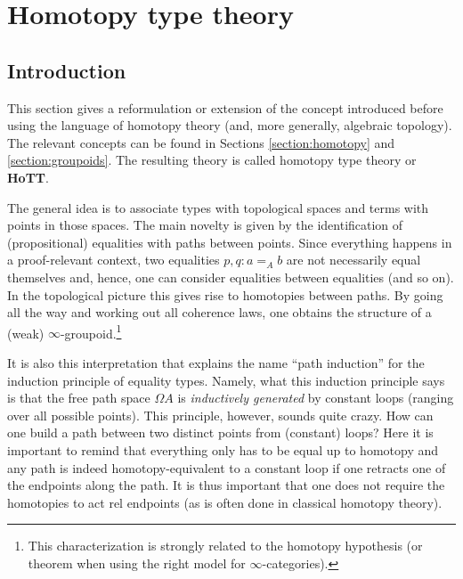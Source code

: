 \section{Homotopy type theory}
\subsection{Introduction}

    This section gives a reformulation or extension of the concept introduced before using the language of homotopy theory (and, more generally, algebraic topology). The relevant concepts can be found in Sections \ref{section:homotopy} and \ref{section:groupoids}. The resulting theory is called homotopy type theory or \textbf{HoTT}.

    The general idea is to associate types with topological spaces and terms with points in those spaces. The main novelty is given by the identification of (propositional) equalities with paths between points. Since everything happens in a proof-relevant context, two equalities $p,q:a=_Ab$ are not necessarily equal themselves and, hence, one can consider equalities between equalities (and so on). In the topological picture this gives rise to homotopies between paths. By going all the way and working out all coherence laws, one obtains the structure of a (weak) $\infty$-groupoid.\footnote{This characterization is strongly related to the homotopy hypothesis (or theorem when using the right model for $\infty$-categories).}

    It is also this interpretation that explains the name ``path induction'' for the induction principle of equality types. Namely, what this induction principle says is that the free path space $\Omega A$ is \textit{inductively generated} by constant loops (ranging over all possible points). This principle, however, sounds quite crazy. How can one build a path between two distinct points from (constant) loops? Here it is important to remind that everything only has to be equal up to homotopy and any path is indeed homotopy-equivalent to a constant loop if one retracts one of the endpoints along the path. It is thus important that one does not require the homotopies to act rel endpoints (as is often done in classical homotopy theory).


